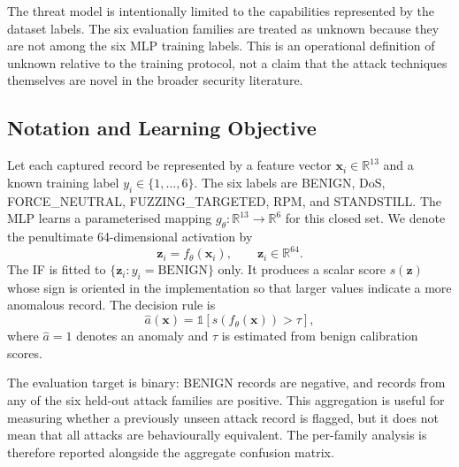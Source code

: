 \documentclass[journal]{IEEEtran}
\begin{document}
The threat model is intentionally limited to the capabilities represented by the dataset labels. The six evaluation families are treated as unknown because they are not among the six MLP training labels. This is an operational definition of unknown relative to the training protocol, not a claim that the attack techniques themselves are novel in the broader security literature.

\subsection{Notation and Learning Objective}
Let each captured record be represented by a feature vector $\mathbf{x}_i\in\mathbb{R}^{13}$ and a known training label $y_i\in\{1,\ldots,6\}$. The six labels are BENIGN, DoS, FORCE\_NEUTRAL, FUZZING\_TARGETED, RPM, and STANDSTILL. The MLP learns a parameterised mapping $g_{\theta}:\mathbb{R}^{13}\rightarrow\mathbb{R}^{6}$ for this closed set. We denote the penultimate 64-dimensional activation by
\begin{equation}
  \mathbf{z}_i=f_{\theta}(\mathbf{x}_i),\qquad \mathbf{z}_i\in\mathbb{R}^{64}.
  \label{eq:embedding}
\end{equation}
The IF is fitted to $\{\mathbf{z}_i:y_i=\mathrm{BENIGN}\}$ only. It produces a scalar score $s(\mathbf{z})$ whose sign is oriented in the implementation so that larger values indicate a more anomalous record. The decision rule is
\begin{equation}
  \widehat{a}(\mathbf{x})=\mathbb{1}\left[s(f_{\theta}(\mathbf{x}))>\tau\right],
  \label{eq:binarydecision}
\end{equation}
where $\widehat{a}=1$ denotes an anomaly and $\tau$ is estimated from benign calibration scores.

The evaluation target is binary: BENIGN records are negative, and records from any of the six held-out attack families are positive. This aggregation is useful for measuring whether a previously unseen attack record is flagged, but it does not mean that all attacks are behaviourally equivalent. The per-family analysis is therefore reported alongside the aggregate confusion matrix.
\end{document}
